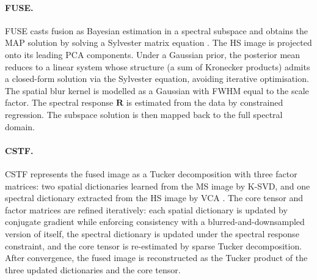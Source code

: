 \paragraph{FUSE.}
FUSE casts fusion as Bayesian estimation in a spectral subspace and obtains the MAP solution by solving a Sylvester matrix equation \cite{wei2015fuse}. The HS image is projected onto its leading PCA components. Under a Gaussian prior, the posterior mean reduces to a linear system whose structure (a sum of Kronecker products) admits a closed-form solution via the Sylvester equation, avoiding iterative optimisation. The spatial blur kernel is modelled as a Gaussian with FWHM equal to the scale factor. The spectral response \(\mathbf{R}\) is estimated from the data by constrained regression. The subspace solution is then mapped back to the full spectral domain.

\paragraph{CSTF.}
CSTF represents the fused image as a Tucker decomposition with three factor matrices: two spatial dictionaries learned from the MS image by K-SVD, and one spectral dictionary extracted from the HS image by VCA \cite{li2018fusing}. The core tensor and factor matrices are refined iteratively: each spatial dictionary is updated by conjugate gradient while enforcing consistency with a blurred-and-downsampled version of itself, the spectral dictionary is updated under the spectral response constraint, and the core tensor is re-estimated by sparse Tucker decomposition. After convergence, the fused image is reconstructed as the Tucker product of the three updated dictionaries and the core tensor.
